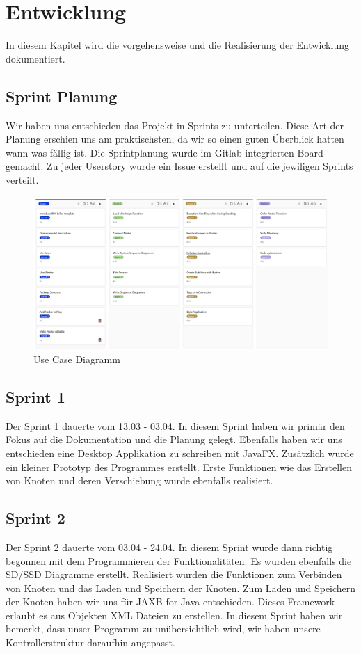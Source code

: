 \chapter{Entwicklung}
\label{chap:entwicklung}
In diesem Kapitel wird die vorgehensweise und die Realisierung der Entwicklung dokumentiert.
\section{Sprint Planung}
\label{sec:sprintplanung}
Wir haben uns entschieden das Projekt in Sprints zu unterteilen. Diese Art der Planung erschien uns
am praktischsten, da wir so einen guten Überblick hatten wann was fällig ist. Die Sprintplanung wurde im Gitlab integrierten Board gemacht. Zu jeder Userstory wurde ein Issue erstellt und auf die jewiligen Sprints verteilt.
\begin{figure}[H]
	\centering
		\includegraphics[scale=0.5]{images/Board.PNG}
	\caption{Use Case Diagramm}
	\label{fig:use_case_diagramm}
\end{figure}

\section{Sprint 1}
\label{sec:sprint_1}
Der Sprint 1 dauerte vom 13.03 - 03.04. In diesem Sprint haben wir primär den Fokus auf die Dokumentation und die Planung gelegt. Ebenfalls haben wir uns entschieden eine Desktop Applikation zu schreiben mit JavaFX. Zusätzlich wurde ein kleiner Prototyp des Programmes erstellt. Erste Funktionen wie das Erstellen von Knoten und deren Verschiebung wurde ebenfalls realisiert.
\section{Sprint 2}
\label{sec:sprint_2}
Der Sprint 2 dauerte vom 03.04 - 24.04. In diesem Sprint wurde dann richtig begonnen mit dem Programmieren der Funktionalitäten. Es wurden ebenfalls die SD/SSD Diagramme erstellt. Realisiert wurden die Funktionen zum Verbinden von Knoten und das Laden und Speichern der Knoten. Zum Laden und Speichern der Knoten haben wir uns für JAXB for Java entschieden. Dieses Framework erlaubt es aus Objekten XML Dateien zu erstellen.
In diesem Sprint haben wir bemerkt, dass unser Programm zu unübersichtlich wird, wir haben unsere Kontrollerstruktur daraufhin angepasst.
